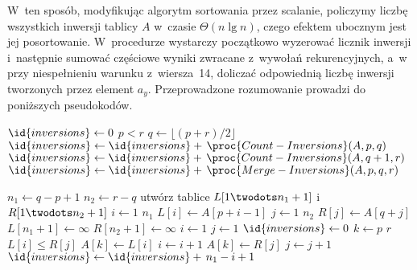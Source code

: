 W~ten sposób, modyfikując algorytm sortowania przez scalanie, policzymy liczbę wszystkich inwersji  tablicy $A$ w~czasie $\Theta(n\lg n)$, czego efektem ubocznym jest jej posortowanie. W~procedurze  wystarczy początkowo wyzerować licznik inwersji i~następnie sumować częściowe wyniki zwracane z~wywołań rekurencyjnych, a~w  przy niespełnieniu warunku z~wiersza~14, doliczać odpowiednią liczbę inwersji tworzonych przez element $a_y$. Przeprowadzone rozumowanie prowadzi do poniższych pseudokodów.

\begin{codebox}
\li	$\id{inversions}\gets0$
\li	\If $p<r$
\li		\Then
			$q\gets\lfloor(p+r)/2\rfloor$
\li			$\id{inversions}\gets\id{inversions}+\,\proc{Count-Inversions}(A,p,q)$
\li			$\id{inversions}\gets\id{inversions}+\,\proc{Count-Inversions}(A,q+1,r)$
\li			$\id{inversions}\gets\id{inversions}+\,\proc{Merge-Inversions}(A,p,q,r)$
		\End
\li	\Return {}
\end{codebox}

\begin{codebox}
\li	$n_1\gets q-p+1$
\li	$n_2\gets r-q$
\li	utwórz tablice $L[1\twodots n_1+1]$ i~$R[1\twodots n_2+1]$
\li	\For $i\gets1$ \To $n_1$
\li		\Do $L[i]\gets A[p+i-1]$
		\End
\li	\For $j\gets1$ \To $n_2$
\li		\Do $R[j]\gets A[q+j]$
		\End
\li	$L[n_1+1]\gets\infty$
\li	$R[n_2+1]\gets\infty$
\li	$i\gets1$
\li	$j\gets1$
\li	$\id{inversions}\gets0$
\li	\For $k\gets p$ \To $r$
\li		\Do
\li			\If $L[i]\le R[j]$
\li				\Then
					$A[k]\gets L[i]$
\li					$i\gets i+1$
\li				\Else
					$A[k]\gets R[j]$
\li					$j\gets j+1$
\li					$\id{inversions}\gets\id{inversions}+\,n_1-i+1$
				\End
		\End
\li	\Return {}
\end{codebox}

\endinput
